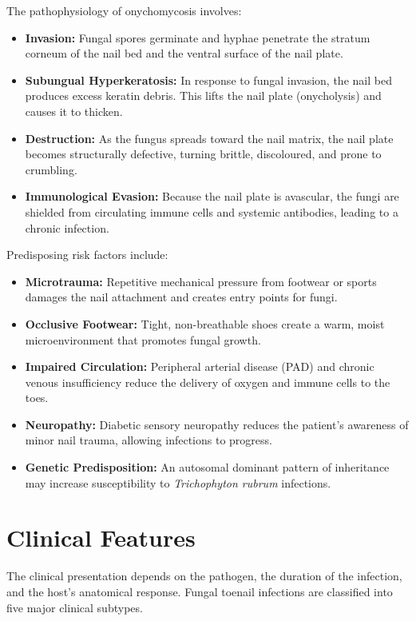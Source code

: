 The pathophysiology of onychomycosis involves:
\begin{itemize}
    \item \textbf{Invasion:} Fungal spores germinate and hyphae penetrate the stratum corneum of the nail bed and the ventral surface of the nail plate.
    \item \textbf{Subungual Hyperkeratosis:} In response to fungal invasion, the nail bed produces excess keratin debris. This lifts the nail plate (onycholysis) and causes it to thicken.
    \item \textbf{Destruction:} As the fungus spreads toward the nail matrix, the nail plate becomes structurally defective, turning brittle, discoloured, and prone to crumbling.
    \item \textbf{Immunological Evasion:} Because the nail plate is avascular, the fungi are shielded from circulating immune cells and systemic antibodies, leading to a chronic infection.
\end{itemize}

Predisposing risk factors include:
\begin{itemize}
    \item \textbf{Microtrauma:} Repetitive mechanical pressure from footwear or sports damages the nail attachment and creates entry points for fungi.
    \item \textbf{Occlusive Footwear:} Tight, non-breathable shoes create a warm, moist microenvironment that promotes fungal growth.
    \item \textbf{Impaired Circulation:} Peripheral arterial disease (PAD) and chronic venous insufficiency reduce the delivery of oxygen and immune cells to the toes.
    \item \textbf{Neuropathy:} Diabetic sensory neuropathy reduces the patient's awareness of minor nail trauma, allowing infections to progress.
    \item \textbf{Genetic Predisposition:} An autosomal dominant pattern of inheritance may increase susceptibility to \emph{Trichophyton rubrum} infections.
\end{itemize}

\section*{Clinical Features}
The clinical presentation depends on the pathogen, the duration of the infection, and the host's anatomical response. Fungal toenail infections are classified into five major clinical subtypes.

